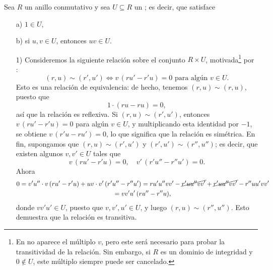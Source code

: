 \begin{construccion}
  Sea $R$ un anillo conmutativo y sea $U \subseteq R$ un ; es decir, que satisface
  \begin{enumerate}
  \item[a)] $1\in U$,

  \item[b)] si $u,v\in U$, entonces $uv \in U$.
  \end{enumerate}

  \begin{enumerate}
  \item[1)] Consideremos la siguiente relación sobre el conjunto $R\times U$,
    motivada\footnote{En  no aparece el
      múltiplo $v$, pero este será necesario para probar la transitividad de la
      relación. Sin embargo, si $R$ es un dominio de integridad y $0 \notin U$,
      este múltiplo siempre puede ser cancelado.} por
    :
    $$(r, u) \sim (r',u') \iff v\,(ru' - r'u) = 0 \text{ para algún }v\in U.$$
    Esto es una relación de equivalencia: de hecho, tenemos $(r,u) \sim (r,u)$,
    puesto que
    $$1\cdot (ru - ru) = 0,$$
    así que la relación es reflexiva. Si $(r,u) \sim (r',u')$, entonces
    $v\,(ru' - r'u) = 0$ para algún $v\in U$, y multiplicando esta identidad por
    $-1$, se obtiene $v\,(r'u - ru') = 0$, lo que significa que la relación es
    simétrica. En fin, supongamos que $(r,u) \sim (r',u')$ y
    $(r',u') \sim (r'', u'')$; es decir, que existen algunos $v, v'\in U$ tales
    que
    $$v\,(ru' - r'u) = 0, \quad v'\,(r'u'' - r''u') = 0.$$
    Ahora
    \begin{multline*}
      0 = v'u''\cdot v\,(ru' - r'u) + uv\cdot v'\,(r'u'' - r''u') =
      ru'u''vv' - \cancel{r'uu''vv'} + \cancel{r'uu''vv'} - r''uu'vv' \\
      = vv'u' \, (ru'' - r''u),
    \end{multline*}
    donde $vv'u' \in U$, puesto que $v, v', u' \in U$, y luego
    $(r,u) \sim (r'',u'')$. Esto demuestra que la relación es transitiva.


\end{enumerate}
\end{construccion}
